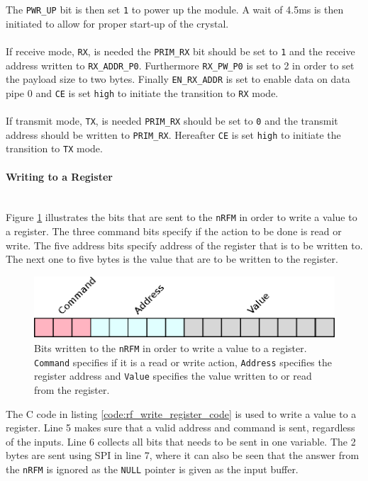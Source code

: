The \texttt{PWR\_UP} bit is then set \texttt{1} to power up the module. 
A wait of 4.5ms is then initiated to allow for proper start-up of the crystal.
\\~\\
If receive mode, \texttt{RX}, is needed the \texttt{PRIM\_RX} bit should be set to \texttt{1} and the receive address written to \texttt{RX\_ADDR\_P0}.
Furthermore \texttt{RX\_PW\_P0} is set to 2 in order to set the payload size to two bytes.
Finally \texttt{EN\_RX\_ADDR} is set to enable data on data pipe 0 and \texttt{CE} is set \texttt{high} to initiate the transition to \texttt{RX} mode.
\\~\\
If transmit mode, \texttt{TX}, is needed \texttt{PRIM\_RX} should be set to \texttt{0} and the transmit address should be written to \texttt{PRIM\_RX}.
Hereafter \texttt{CE} is set \texttt{high} to initiate the transition to \texttt{TX} mode.

\paragraph{Writing to a Register} %
\label{par:writing_to_a_register}
~\\
Figure \ref{fig:rw_register} illustrates the bits that are sent to the \texttt{nRFM} in order to write a value to a register. 
The three command bits specify if the action to be done is read or write.
The five address bits specify address of the register that is to be written to. 
The next one to five bytes is the value that are to be written to the register.

\begin{figure}[!h]
	\centering
	\includegraphics[width=.5\linewidth]{graphics/rw_register.eps}
	\caption[Writing bits to a register on nRF24L01.]{Bits written to the \texttt{nRFM} in order to write a value to a register. \texttt{Command} specifies if it is a read or write action, \texttt{Address} specifies the register address and \texttt{Value} specifies the value written to or read from the register.}
	\label{fig:rw_register}
\end{figure}

The C code in listing \ref{code:rf_write_register_code} is used to write a value to a register. 
Line 5 makes sure that a valid address and command is sent, regardless of the inputs.
Line 6 collects all bits that needs to be sent in one variable. 
The 2 bytes are sent using SPI in line 7, where it can also be seen that the answer from the \texttt{nRFM} is ignored as the \texttt{NULL} pointer is given as the input buffer.  

